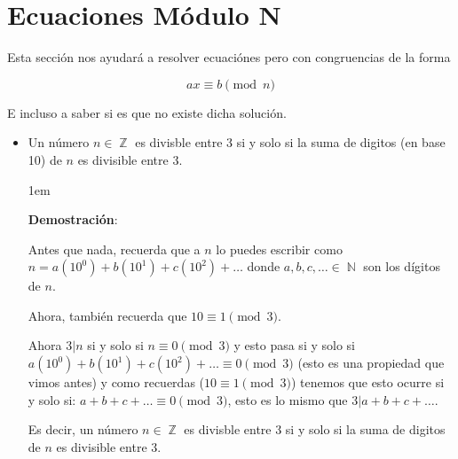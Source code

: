 \documentclass[12pt, fleqn]{report}                             %
\newenvironment{SmallIndentation}[1][0.75em]                    %
    {\begin{adjustwidth}{#1}{}\begin{footnotesize}}                 %
    {\end{footnotesize}\end{adjustwidth}}                           %
\DeclareMathOperator \Naturals  {\mathbb{N}}                     %
\DeclareMathOperator \Integers  {\mathbb{Z}}                     %
\begin{document}
    \clearpage
    \section{Ecuaciones Módulo N}

        Esta sección nos ayudará a resolver ecuaciónes pero con
        congruencias de la forma

        \begin{equation}
            ax \equiv b \pmod{n}
        \end{equation}

        E incluso a saber si es que no existe dicha solución.

        \begin{itemize}

            \item Un número $n \in \Integers$ es divisble entre 3 si y solo si
                la suma de digitos (en base 10) de $n$ es divisible entre 3.

                \begin{SmallIndentation}[1em]
                    \textbf{Demostración}:

                    Antes que nada, recuerda que a $n$ lo puedes escribir como
                    $n = a(10^0) + b(10^1) + c(10^2) + \dots$ donde
                    $a, b, c, \dots \in \Naturals$ son los dígitos de $n$.

                    Ahora, también recuerda que $10 \equiv 1 \pmod{3}$.

                    Ahora $3|n$ si y solo si $n \equiv 0 \pmod{3}$ y esto pasa si
                    y solo si $a(10^0) + b(10^1) + c(10^2) + \dots \equiv 0 \pmod{3}$
                    (esto es una propiedad que vimos antes) y como recuerdas
                    ($10 \equiv 1 \pmod{3}$) tenemos que esto ocurre si y solo si:
                    $a + b + c + \dots \equiv 0 \pmod{3}$, esto es lo mismo que
                    $3|a+b+c+\dots$.

                    Es decir, un número $n \in \Integers$ es divisble entre 3 si y solo si
                    la suma de digitos de $n$ es divisible entre 3.

                \end{SmallIndentation}

        \end{itemize}
\end{document}
